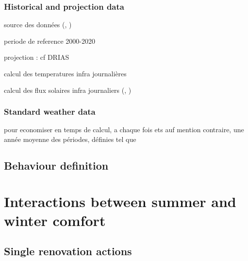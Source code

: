 \documentclass[11pt]{article}
\begin{document}
        \subsubsection{Historical and projection data} %
        \label{ssub:historical_data}
        
        source des données 
        (\cite{hersbach_era5_2020}, \cite{zippenfenig_open-meteocom_2024})

        periode de reference 2000-2020

        projection : \cite{sauquet_explore2_2021} cf DRIAS

        calcul des temperatures infra journalières 

        calcul des flux solaires infra journaliers (\cite{knight_methodology_1991}, \cite{chow_new_2007})

        \subsubsection{Standard weather data} %
        \label{ssub:standard_weather_data}
        
        pour economiser en temps de calcul, a chaque fois ets auf mention contraire, une année moyenne des périodes, définies tel que
    

    \subsection{Behaviour definition} %
    \label{sub:behaviour_definition}


    

\clearpage
\section{Interactions between summer and winter comfort}
\label{sec:inter}

    \subsection{Single renovation actions} %
    \label{sub:single_renovation_actions}
    
\end{document}
